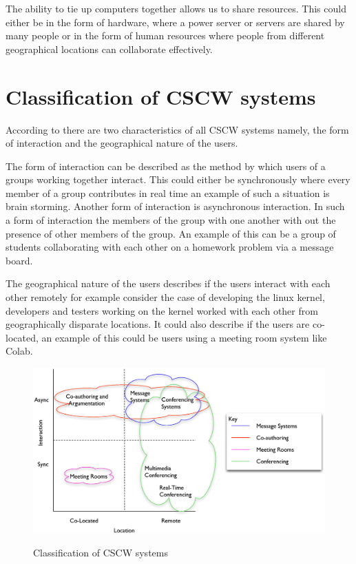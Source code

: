 The ability to tie up computers together allows us to share
resources. This could either be in the form of hardware, where a power
server or servers are shared by many people or in the form of human
resources where people from different geographical locations can
collaborate effectively.


\section{Classification of CSCW systems}

According to \cite{journals/iwc/Rodden91} there are two
characteristics of all CSCW systems namely, the form of interaction
and the geographical nature of the users. 

The form of interaction can be described as the method by which users
of a groups working together interact. This could either be
synchronously where every member of a group contributes in real time
an example of such a situation is brain storming. Another form of
interaction is asynchronous interaction. In such a form of interaction
the members of the group with one another with out the presence of
other members of the group. An example of this can be a group of
students collaborating with each other on a homework problem via a
message board.

The geographical nature of the users describes if the users interact
with each other remotely for example consider the case of developing
the linux kernel, developers and testers working on the kernel worked
with each other from geographically disparate locations. It could
also describe if the users are co-located, an example of this could be
users using a meeting room system like Colab\cite{Stefik:1987:BCU}. 

\begin{figure}[htp]
  \caption{Classification of CSCW systems\cite{journals/iwc/Rodden91}}
  \centering
  \includegraphics[width=140mm]{CSCWClass.eps}
  \label{CLASS_CSCW}
\end{figure}

